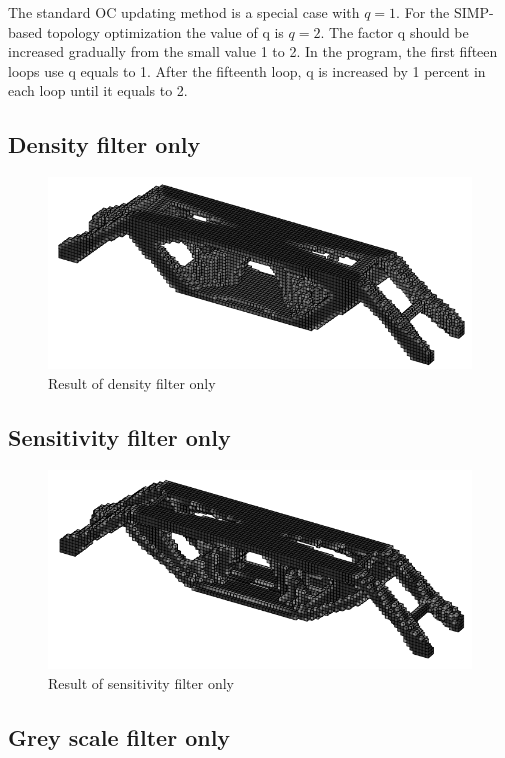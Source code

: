 \documentclass{article}
\begin{document}
The standard OC updating method is a special case with $q=1$. For the SIMP-based topology optimization the value of q is $q = 2$. The factor q should be increased gradually from the small value 1 to 2. In the program, the first fifteen loops use q equals to 1. After the fifteenth loop, q is increased by 1 percent in each loop until it equals to 2. 
\subsection{Density filter only}

\begin{figure}[!htbp]
\centering
\includegraphics[width=1\textwidth]{Densityfilteronly}
\caption{Result of density filter only}
\end{figure}
\FloatBarrier

\subsection{Sensitivity filter only}

\begin{figure}[!htbp]
\centering
\includegraphics[width=1\textwidth]{Sensitivityfilteronly}
\caption{Result of sensitivity filter only}
\end{figure}
\FloatBarrier

\subsection{Grey scale filter only}
\end{document}
